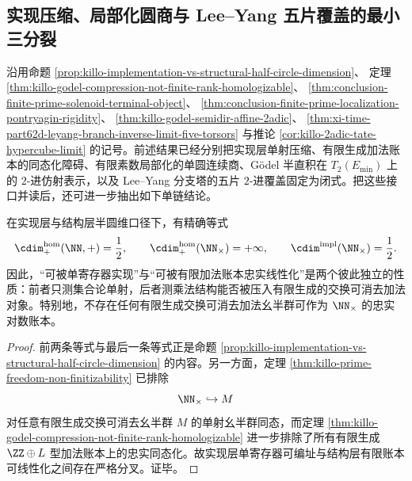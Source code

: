 \subsection{实现压缩、局部化圆商与 Lee--Yang 五片覆盖的最小三分裂}\label{subsec:conclusion-phase-ledger-branch-trisplitting}
沿用命题 \ref{prop:killo-implementation-vs-structural-half-circle-dimension}、
定理 \ref{thm:killo-godel-compression-not-finite-rank-homologizable}、
\ref{thm:conclusion-finite-prime-solenoid-terminal-object}、
\ref{thm:conclusion-finite-prime-localization-pontryagin-rigidity}、
\ref{thm:killo-godel-semidir-affine-2adic}、
\ref{thm:xi-time-part62d-leyang-branch-inverse-limit-five-torsors}
与推论 \ref{cor:killo-2adic-tate-hypercube-limit} 的记号。前述结果已经分别把实现层单射压缩、有限生成加法账本的同态化障碍、有限素数局部化的单圆连续商、Gödel 半直积在 \(T_2(E_{\min})\) 上的 \(2\)-进仿射表示，以及 Lee--Yang 分支塔的五片 \(2\)-进覆盖固定为闭式。把这些接口并读后，还可进一步抽出如下单链结论。

\begin{theorem}[实现压缩与同态线性化的严格分叉]\label{thm:conclusion-implementation-compression-hom-linearization-split}
在实现层与结构层半圆维口径下，有精确等式
\[
\cdim^{\mathrm{hom}}_{+}(\NN,+)=\frac12,
\qquad
\cdim^{\mathrm{hom}}_{+}(\NN_{\times})=+\infty,
\qquad
\cdim^{\mathrm{impl}}(\NN_{\times})=\frac12.
\]
因此，“可被单寄存器实现”与“可被有限加法账本忠实线性化”是两个彼此独立的性质：前者只测集合论单射，后者测乘法结构能否被压入有限生成的交换可消去加法对象。特别地，不存在任何有限生成交换可消去加法幺半群可作为 \(\NN_{\times}\) 的忠实对数账本。
\end{theorem}
\begin{proof}
前两条等式与最后一条等式正是命题 \ref{prop:killo-implementation-vs-structural-half-circle-dimension} 的内容。另一方面，定理 \ref{thm:killo-prime-freedom-non-finitizability} 已排除
\[
\NN_{\times}\hookrightarrow M
\]
对任意有限生成交换可消去幺半群 \(M\) 的单射幺半群同态，而定理 \ref{thm:killo-godel-compression-not-finite-rank-homologizable} 进一步排除了所有有限生成 \(\ZZ\oplus L\) 型加法账本上的忠实同态化。故实现层单寄存器可编址与结构层有限账本可线性化之间存在严格分叉。证毕。
\end{proof}

